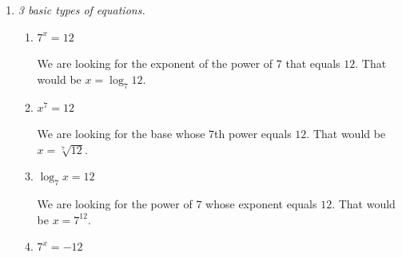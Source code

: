 \documentclass{article}
\begin{document}
\begin{enumerate}[resume]
\begin{enumerate}
    \end{enumerate}
  \probonly{\end{multicols}}

  \pspace{\vfill}

\item  \label{exp-log-basic}


  \emph{3 basic types of equations.} 

  \begin{enumerate}
  \item \label{exp-log-basic-var-in-exponent}
    \begin{problem}[\stretch{0.2}]
      $7^x = 12$
    \end{problem}

    \begin{solution}
      We are looking for the exponent of the power of $7$ that equals 
      $12$. That would be
      $x=\boxed{\log_7 12}$.
    \end{solution}

  \item
    \begin{problem}[\stretch{0.2}]
      $x^7 = 12$
    \end{problem}

    \begin{solution}
      We are looking for the base whose $7$th power equals $12$.
      That would be $x=\boxed{\sqrt[7]{12}}$.
    \end{solution}

  \item
    \begin{problem}[\stretch{0.2}]
      $\log_7 x = 12$
    \end{problem}

    \begin{solution}
      We are looking for the power of $7$ whose exponent equals $12$.
      That would be $x=\boxed{7^{12}}$.
    \end{solution}

  \item


    \begin{problem}[\stretch{0.2}]
      $7^x = -12$
    \end{problem}


\end{enumerate}
\end{enumerate}
\end{document}
